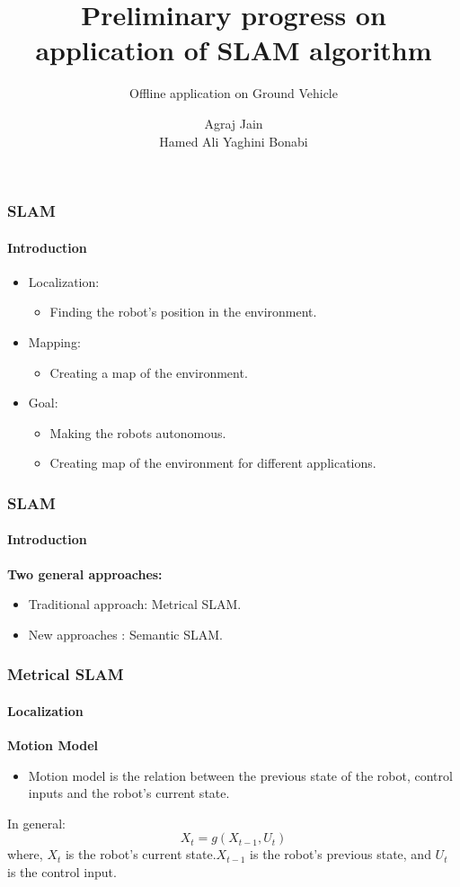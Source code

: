 \documentclass{beamer}
\title{Preliminary progress on application of SLAM algorithm}
\subtitle{Offline application on Ground Vehicle}
\author{Agraj Jain  \\Hamed Ali Yaghini Bonabi}
\institute{Control/Robotics Research Laboratory}
\begin{document}
	\frame{\titlepage}
	

	\begin{frame}
		\frametitle{SLAM}
		
		\framesubtitle{Introduction}

		\begin{itemize}
			\item Localization:

			\begin{itemize}
				\item  Finding the robot's position in the environment.
			\end{itemize}

			\item Mapping:
			\begin{itemize}
				\item Creating a map of the environment.
			\end{itemize}

			\item Goal:
			\begin{itemize}
				\item  Making the robots autonomous.
				\item Creating map of the environment for different applications.
			\end{itemize}

		\end{itemize}

	\end{frame}


	\begin{frame}
		\frametitle{SLAM}
		
		\framesubtitle{Introduction}
		
		\textbf{Two general approaches:}
		\begin{itemize}
			\item Traditional approach: Metrical SLAM.
			\item  New approaches : Semantic SLAM.
		\end{itemize}

	\end{frame}


	\begin{frame}
		\frametitle{Metrical SLAM}
		
		\framesubtitle{Localization}

		\textbf{Motion Model}
		\begin{itemize}
			\item Motion model is the relation between the previous state of the robot, control inputs and the robot's current state.
		\end{itemize}
		In general:
		\begin{equation*}
			X_t=g(X_{t-1},U_t)
		\end{equation*}
where, $X_t$ is the robot's current state.$X_{t-1}$  is the robot's previous state, and $U_t$ is the control input.

	\end{frame}
\end{document}
